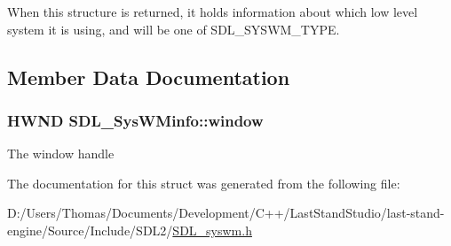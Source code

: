 When this structure is returned, it holds information about which low level system it is using, and will be one of S\+D\+L\+\_\+\+S\+Y\+S\+W\+M\+\_\+\+T\+Y\+P\+E. 

\subsection{Member Data Documentation}
\hypertarget{structSDL__SysWMinfo_af06225591ff07e837bbd037728a525b9}{}
\subsubsection[{window}]{\setlength{\rightskip}{0pt plus 5cm}H\+W\+N\+D S\+D\+L\+\_\+\+Sys\+W\+Minfo\+::window}\label{structSDL__SysWMinfo_af06225591ff07e837bbd037728a525b9}
The window handle 

The documentation for this struct was generated from the following file\+:\begin{DoxyCompactItemize}
\item 
D\+:/\+Users/\+Thomas/\+Documents/\+Development/\+C++/\+Last\+Stand\+Studio/last-\/stand-\/engine/\+Source/\+Include/\+S\+D\+L2/\hyperlink{SDL__syswm_8h}{S\+D\+L\+\_\+syswm.\+h}\end{DoxyCompactItemize}
